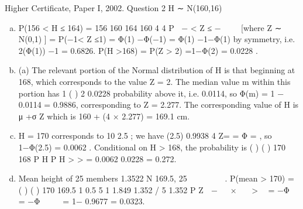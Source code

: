 \documentclass[a4paper,12pt]{article}
\begin{document}
Higher Certificate, Paper I, 2002. Question 2
H ∼ N(160,16)
\begin{enumerate}[(a)]
\item  P(156 < H ≤ 164) = 156 160 164 160
4 4
P − < Z ≤ − 
 
[where Z ∼ N(0,1) ]
= P(−1< Z ≤1) = Φ(1) −Φ(−1) = Φ(1) −{1−Φ(1)} by symmetry, i.e. 2(Φ(1)) −1
= 0.6826.
P(H >168) = P(Z > 2) =1−Φ(2) = 0.0228 .
\item  (a) The relevant portion of the Normal distribution of H is that beginning
at 168, which corresponds to the value Z = 2. The median value m within this
portion has 1 ( )
2 0.0228 probability above it, i.e. 0.0114, so Φ(m) =
1 − 0.0114 = 0.9886, corresponding to Z = 2.277. The corresponding value of
H is μ +σ Z which is 160 + (4 × 2.277) = 169.1 cm.
\item H = 170 corresponds to 10 2.5 ; we have (2.5) 0.9938
4
Z= = Φ = , so
1−Φ(2.5) = 0.0062 . Conditional on H > 168, the probability is ( )
( )
170
168
P H
P H
>
>
= 0.0062
0.0228
= 0.272.
\item Mean height of 25 members
1.3522 N 169.5,
25
 
∼  
 
.
P(mean > 170) = ( ) ( ) 170 169.5 1 0.5 5 1 1.849
1.352 / 5 1.352
P Z
 −   ×   >  = −Φ  = −Φ    
= 1− 0.9677 = 0.0323.
\end{enumerate}
\end{document}
